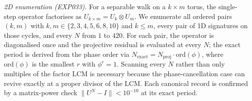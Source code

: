 \emph{2D enumeration (EXP033).} For a separable walk on a $k \times m$ torus,
the single-step operator factorises as
$U_{k \times m} = U_k \otimes U_m$. We enumerate all ordered pairs
$(k, m)$ with $k, m \in \{2, 3, 4, 5, 6, 8, 10\}$ and $k \le m$,
every pair of 1D signatures on those cycles, and every $N$ from $1$
to $420$. For each pair, the operator is diagonalised once and the
projective residual is evaluated at every $N$; the exact period is
derived from the phase order via
$N_{\text{exact}} = N_{\text{proj}} \cdot \mathrm{ord}(\phi)$,
where $\mathrm{ord}(\phi)$ is the smallest $r$ with $\phi^r = 1$.
Scanning every $N$ rather than only multiples of the factor LCM is
necessary because the phase-cancellation case can revive exactly at
a proper divisor of the LCM. Each canonical record is confirmed by a
matrix-power check $\|U^N - I\| < 10^{-10}$ at its exact period.
